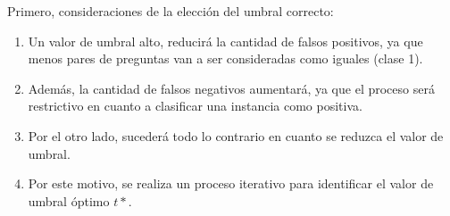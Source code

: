 \begin{frame}[allowframebreaks]
	\framebreak

	Primero, consideraciones de la elección del umbral correcto:
	\bigskip
	\begin{enumerate}[<*>]
		\item Un valor de umbral alto, reducirá la cantidad de falsos positivos, ya que menos pares de preguntas van a ser consideradas como iguales (clase 1).
		\item Además, la cantidad de falsos negativos aumentará, ya que el proceso será restrictivo en cuanto a clasificar una instancia como positiva.
		\item Por el otro lado, sucederá todo lo contrario en cuanto se reduzca el valor de umbral.
		\item Por este motivo, se realiza un proceso iterativo para identificar el valor de umbral óptimo \(t*\).
	\end{enumerate}
\end{frame}